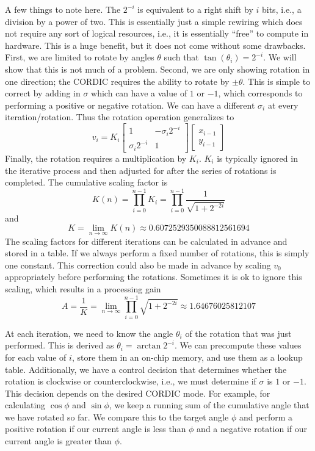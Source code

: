 A few things to note here. The $2^{-i}$ is equivalent to a right shift by $i$ bits, i.e., a division by a power of two. This is essentially just a simple rewiring which does not require any sort of logical resources, i.e., it is essentially ``free'' to compute in hardware. This is a huge benefit, but it does not come without some drawbacks. First, we are limited to rotate by angles $\theta$ such that $\tan(\theta_i) = 2^{-i}$. We will show that this is not much of a problem. Second, we are only showing rotation in one direction; the CORDIC requires the ability to rotate by $\pm \theta$. This is simple to correct by adding in $\sigma$ which can have a value of $1$ or $-1$, which corresponds to performing a positive or negative rotation. We can have a different $\sigma_i$ at every iteration/rotation. Thus the rotation operation generalizes to
\begin{equation}
v_i = K_i \begin{bmatrix} 1 & -\sigma_i 2^{-i} \\ \sigma_i 2^{-i} & 1 \end{bmatrix} \begin{bmatrix} x_{i-1} \\ y_{i-1} \end{bmatrix}
\end{equation}
Finally, the rotation requires a multiplication by $K_i$.  $K_i$ is typically ignored in the iterative process and then adjusted for after the series of rotations is completed. The cumulative scaling factor is
\begin{equation}
K(n) = \prod_{i=0}^{n-1} K_i  = \prod_{i=0}^{n-1}\frac {1}{\sqrt{1 + 2^{-2i}}}
\end{equation} and  
\begin{equation}
K = \lim_{n \to \infty}K(n) \approx 0.6072529350088812561694
\end{equation}
The scaling factors for different iterations can be calculated in advance and stored in a table. If we always perform a fixed number of rotations, this is simply one constant. This correction could also be made in advance by scaling $v_0$ appropriately before performing the rotations. Sometimes it is ok to ignore this scaling, which results in a processing gain
\begin{equation}
A = \frac{1}{K} = \lim_{n \to \infty} \prod_{i=0}^{n-1} {\sqrt{1 + 2^{-2i}}}\approx 1.64676025812107
\label{eq:cordicgain}
\end{equation}

At each iteration, we need to know the angle $\theta_i$ of the rotation that was just performed. This is derived as $\theta_i = \arctan 2^{-i}$. We can precompute these values for each value of $i$, store them in an on-chip memory, and use them as a lookup table. Additionally, we have a control decision that determines whether the rotation is clockwise or counterclockwise, i.e., we must determine if $\sigma$ is $1$ or $-1$. This decision depends on the desired CORDIC mode. For example, for calculating $\cos \phi$ and $\sin \phi$, we keep a running sum of the cumulative angle that we have rotated so far. We compare this to the target angle $\phi$ and perform a positive rotation if our current angle is less than $\phi$ and a negative rotation if our current angle is greater than $\phi$. 

